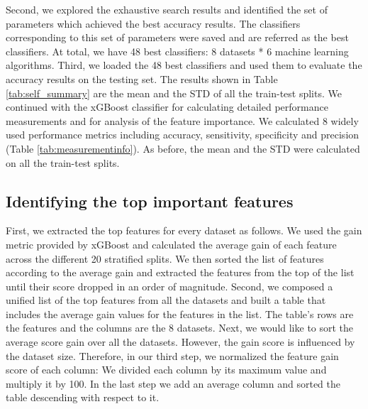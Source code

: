 \documentclass{bmcart}
\begin{document}
Second, we explored the exhaustive search results and identified the set of parameters which achieved the best accuracy results. The classifiers corresponding to this set of parameters were saved and are referred as the best classifiers. At total, we have 48 best classifiers: 8 datasets * 6 machine learning algorithms.
Third, we loaded the 48 best classifiers and used them to evaluate the accuracy results on the testing set. The results shown in Table \ref{tab:self_summary} are the mean and the STD of all the train-test splits.
We continued with the xGBoost classifier for calculating detailed performance measurements and for analysis of the feature importance. We calculated 8 widely used performance metrics including accuracy, sensitivity, specificity and precision (Table \ref{tab:measurementinfo}). As before, the mean and the STD were calculated on all the train-test splits.



\subsection*{Identifying the top important features}
First, we extracted the top features for every dataset as follows. We used the gain metric provided by xGBoost and calculated the average gain of each feature across the different 20 stratified splits. We then sorted the list of features according to the average gain and extracted the features from the top of the list until their score dropped in an order of magnitude.  
Second, we composed a unified list of the top features from all the datasets and built a table that includes the average gain values for the features in the list. The table's rows are the features and the columns are the 8 datasets. Next, we would like to sort the average score gain over all the datasets. However, the gain score is influenced by the dataset size. Therefore, in our third step, we normalized the feature gain score of each column: We divided each column by its maximum value and multiply it by 100. In the last step we add an average column and sorted the table descending with respect to it.
\end{document}
